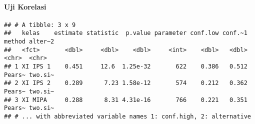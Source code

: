 \documentclass[
]{article}
\newenvironment{Shaded}{\begin{snugshade}}{\end{snugshade}}
\newcommand{\AttributeTok}[1]{\textcolor[rgb]{0.77,0.63,0.00}{#1}}
\newcommand{\FunctionTok}[1]{\textcolor[rgb]{0.00,0.00,0.00}{#1}}
\newcommand{\NormalTok}[1]{#1}
\newcommand{\OtherTok}[1]{\textcolor[rgb]{0.56,0.35,0.01}{#1}}
\newcommand{\SpecialCharTok}[1]{\textcolor[rgb]{0.00,0.00,0.00}{#1}}
\begin{document}
\hypertarget{uji-korelasi}{%
\paragraph{Uji Korelasi}\label{uji-korelasi}}

\begin{Shaded}
\end{Shaded}

\begin{verbatim}
## # A tibble: 3 x 9
##   kelas    estimate statistic  p.value parameter conf.low conf.~1 method alter~2
##   <fct>       <dbl>     <dbl>    <dbl>     <int>    <dbl>   <dbl> <chr>  <chr>  
## 1 XI IPS 1    0.451     12.6  1.25e-32       622    0.386   0.512 Pears~ two.si~
## 2 XI IPS 2    0.289      7.23 1.58e-12       574    0.212   0.362 Pears~ two.si~
## 3 XI MIPA     0.288      8.31 4.31e-16       766    0.221   0.351 Pears~ two.si~
## # ... with abbreviated variable names 1: conf.high, 2: alternative
\end{verbatim}
\end{document}
